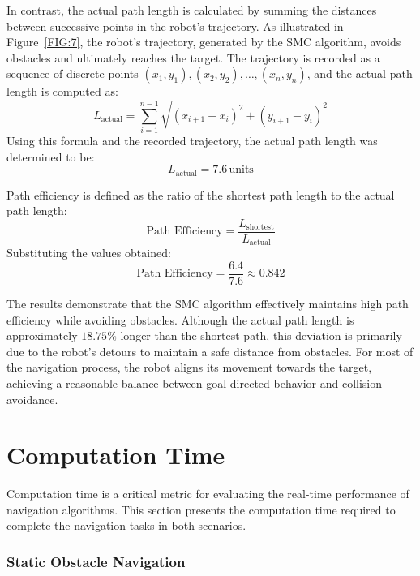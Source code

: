 In contrast, the actual path length is calculated by summing the distances between successive points in the robot's trajectory. As illustrated in Figure~\ref{FIG:7}, the robot's trajectory, generated by the SMC algorithm, avoids obstacles and ultimately reaches the target. The trajectory is recorded as a sequence of discrete points $(x_1, y_1), (x_2, y_2), \dots, (x_n, y_n)$, and the actual path length is computed as:
\begin{equation}
L_{\text{actual}} = \sum_{i=1}^{n-1} \sqrt{(x_{i+1} - x_i)^2 + (y_{i+1} - y_i)^2}
\end{equation}
Using this formula and the recorded trajectory, the actual path length was determined to be:
\begin{equation}
L_{\text{actual}} = 7.6 \, \text{units}
\end{equation}

Path efficiency is defined as the ratio of the shortest path length to the actual path length:
\begin{equation}
\text{Path Efficiency} = \frac{L_{\text{shortest}}}{L_{\text{actual}}}
\end{equation}
Substituting the values obtained:
\begin{equation}
\text{Path Efficiency} = \frac{6.4}{7.6} \approx 0.842
\end{equation}

The results demonstrate that the SMC algorithm effectively maintains high path efficiency while avoiding obstacles. Although the actual path length is approximately \(18.75\%\) longer than the shortest path, this deviation is primarily due to the robot's detours to maintain a safe distance from obstacles. For most of the navigation process, the robot aligns its movement towards the target, achieving a reasonable balance between goal-directed behavior and collision avoidance.

\section{Computation Time}

Computation time is a critical metric for evaluating the real-time performance of navigation algorithms. This section presents the computation time required to complete the navigation tasks in both scenarios.

\subsubsection{Static Obstacle Navigation}

